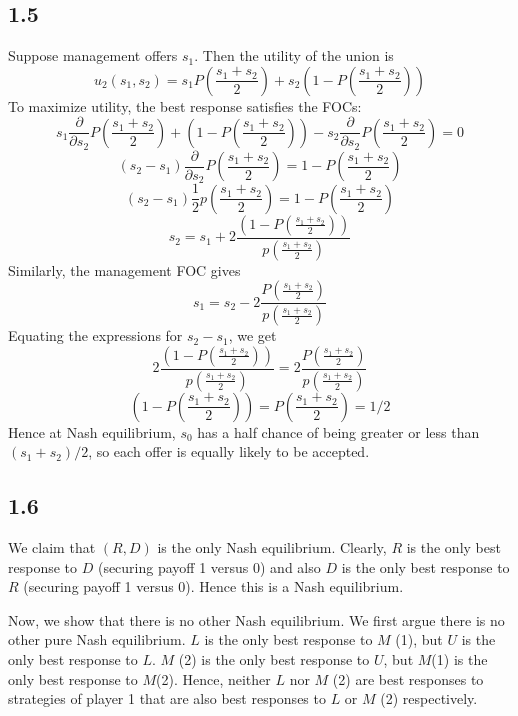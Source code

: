 \documentclass[10pt,letter]{article}
\begin{document}
\subsection*{1.5}
Suppose management offers $s_1$. Then the utility of the union is
\[ u_2(s_1, s_2) = s_1 P\left( \frac{s_1 + s_2}{2} \right) + s_2\left(1 - P\left( \frac{s_1 + s_2}{2} \right)\right) \]
To maximize utility, the best response satisfies the FOCs:
\[ s_1 \frac{\partial}{\partial s_2}P\left( \frac{s_1 + s_2}{2} \right) + \left(1 - P\left( \frac{s_1 + s_2}{2} \right)\right) - s_2 \frac{\partial}{\partial s_2}P\left( \frac{s_1 + s_2}{2} \right) = 0\]
\[ (s_2 - s_1) \frac{\partial}{\partial s_2}P\left( \frac{s_1 + s_2}{2} \right) = 1 - P\left( \frac{s_1 + s_2}{2} \right)\]
\[ (s_2 - s_1) \frac{1}{2}p\left( \frac{s_1 + s_2}{2} \right) = 1 - P\left( \frac{s_1 + s_2}{2} \right)\]
\[ s_2 = s_1 + 2 \frac{\left( 1 - P\left( \frac{s_1 + s_2}{2} \right)\right)}{p\left( \frac{s_1 + s_2}{2} \right)}\]
Similarly, the management FOC gives
\[ s_1 = s_2 - 2 \frac{P\left( \frac{s_1 + s_2}{2} \right)}{p\left( \frac{s_1 + s_2}{2} \right)}  \]
Equating the expressions for $s_2 - s_1$, we get
\[ 2 \frac{\left( 1 - P\left( \frac{s_1 + s_2}{2} \right)\right)}{p\left( \frac{s_1 + s_2}{2} \right)} = 2 \frac{P\left( \frac{s_1 + s_2}{2} \right)}{p\left( \frac{s_1 + s_2}{2} \right)}\]
\[ \left( 1 - P\left( \frac{s_1 + s_2}{2} \right)\right) = P\left( \frac{s_1 + s_2}{2} \right) = 1/2\]
Hence at Nash equilibrium, $s_0$ has a half chance of being greater or less than $(s_1 + s_2)/2$, so each offer is equally likely to be accepted.
\subsection*{1.6}
We claim that $(R, D)$ is the only Nash equilibrium. Clearly, $R$ is the only best response to $D$ (securing payoff 1 versus 0) and also $D$ is the only best response to $R$ (securing payoff 1 versus 0). Hence this is a Nash equilibrium.

Now, we show that there is no other Nash equilibrium. We first argue there is no other pure Nash equilibrium. $L$ is the only best response to $M$ (1), but $U$ is the only best response to $L$. $M$ (2) is the only best response to $U$, but $M$(1) is the only best response to $M$(2). Hence, neither $L$ nor $M$ (2) are best responses to strategies of player 1 that are also best responses to $L$ or $M$ (2) respectively.
\end{document}
